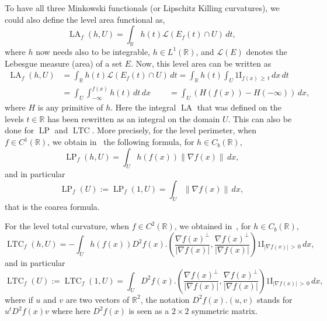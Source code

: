 \documentclass[10pt]{amsart}
\theoremstyle{definition}\newtheorem{defi}[theo]{Definition}\newtheorem{rema}[theo]{Remark}\newtheorem{exam}[theo]{Example}\newtheorem{exem}[theo]{Example}\newtheorem{nota}[theo]{Notation}
\newcommand{\R}{\mathbb{R}}
\newcommand{\ind}{{1\!\!\mathrm{I}}}
\DeclareMathOperator{\LTC}{LTC}
\DeclareMathOperator{\LP}{LP}
\DeclareMathOperator{\LA}{LA}
\newcommand{\calL}{\mathcal{L}}
\begin{document}
To have all three Minkowski functionals (or Lipschitz Killing curvatures), we could also define the level area functional as,
\[
\LA_f(h,U) = \int_\R h(t) \calL \left(E_f(t)\cap U\right) \, dt,
\]
where $h$ now needs also to be integrable, $h\in L^1(\R)$, and $\calL(E)$ denotes the Lebesgue measure (area) of a set $E$. Now, this level area can be written as
\begin{align*}
\LA_f(h,U) & = \int_\R h(t) \calL \left(E_f(t)\cap U\right) \, dt = \int_\R h(t)
\int_U \ind_{f(x)\,\geq\,t} \, dx \, dt \\
& = \int_U \int_{-\infty}^{f(x)} h(t) \, dt \, dx \qquad\:= \int_U \left(H(f(x)) - H(-\infty)\right) \, dx,
\end{align*}
where $H$ is any primitive of $h$. Here the integral $\LA$ that was defined on the levels $t\in\R$ has been rewritten as an integral on the domain $U$. This can also be done for $\LP$ and $\LTC$. More precisely, for the level perimeter, when $f \in C^1(\R)$, we obtain in~\cite{BD-A0P-2016} the following formula, for $h\in C_b(\R)$,
\begin{equation}\label{LPfsmooth:eq}
\LP_f (h,U) = \int_U h(f(x)) \left\|\nabla f(x)\right\| \, dx,
\end{equation}
and in particular
\begin{equation}\label{LPUfsmooth:eq}
\LP_f (U) := \LP_f (1,U) = \int_U \left\|\nabla f(x)\right\| \, dx,
\end{equation}
that is the coarea formula.


For the level total curvature, when $f \in C^2(\R)$, we obtained in~\cite{BD-Geometry-published}, for $h\in C_b(\R)$,
\begin{equation}\label{LTCfsmooth:eq}
\LTC_f (h,U) = - \int_U h(f(x)) D^2f(x).\left(\frac{\nabla f(x)^\perp}{|\nabla f(x)|}, \frac{\nabla f(x)^\perp}{|\nabla f(x)|} \right) \ind_{\left|\nabla f(x)\right|\,>\,0} \, dx,
\end{equation}
and in particular
\begin{equation}\label{LTCUfsmooth:eq}
\LTC_f (U) := \LTC_f (1,U) = \int_U D^2f(x).\left(\frac{\nabla f(x)^\perp}{|\nabla f(x)|}, \frac{\nabla f(x)^\perp}{|\nabla f(x)|} \right) \ind_{\left|\nabla f(x)\right|\,>\,0} \, dx,
\end{equation}
where if $u$ and $v$ are two vectors of $\R^2$, the notation $D^2f(x).(u,v)$ stands for $u^t D^2f(x) v$ where here $D^2f(x)$ is seen as a $2\times 2$ symmetric matrix.
\end{document}
